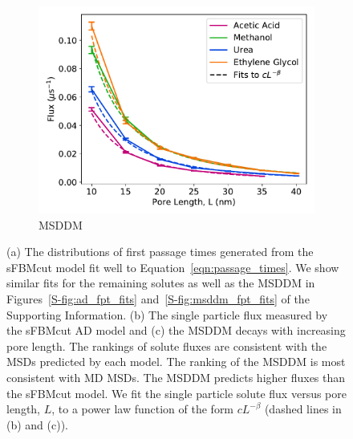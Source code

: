 \documentclass{article}
\begin{document}
\begin{figure}
\begin{subfigure}{0.325\textwidth}
  \end{subfigure}
  \begin{subfigure}{0.325\textwidth}
  \includegraphics[width=\textwidth]{flux_curves_msddm.pdf}
  \caption{MSDDM}\label{fig:flux_curves_msddm}
  \end{subfigure}  
  \caption{(a) The distributions of first passage times generated from the sFBMcut model
  fit well to Equation~\ref{eqn:passage_times}. We show similar fits for the remaining
  solutes as well as the MSDDM in Figures~\ref{S-fig:ad_fpt_fits} and~\ref{S-fig:msddm_fpt_fits}
  of the Supporting Information. (b) The single particle flux measured 
  by the sFBMcut AD model and (c) the MSDDM decays with increasing pore length. 
  The rankings of solute fluxes are consistent with the MSDs predicted by each model.
  The ranking of the MSDDM is most consistent with MD MSDs. The MSDDM predicts higher
  fluxes than the sFBMcut model. We fit the single particle solute flux versus pore
  length, $L$, to a power law function of the form $cL^{-\beta}$ (dashed lines in (b)
  and (c)). 
  }\label{fig:flux_curves}
  \end{figure}
  
\end{document}
